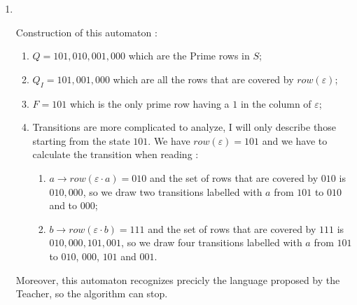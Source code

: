 \begin{enumerate}
  \item \begin{minipage}{0.3\textwidth}
          
        \end{minipage}\quad\\
        \begin{minipage}{1\textwidth}
          Construction of this automaton :
          \begin{enumerate}
            \item $Q = {101,010,001,000}$ which are the Prime rows in $S$;
            \item $Q_I = {101,001,000}$ which are all the rows that are covered by $row(\varepsilon)$;
            \item $F = {101}$ which is the only prime row having a $1$ in the column of $\varepsilon$;
            \item Transitions are more complicated to analyze, I will only describe those starting from the state $101$. We have $row(\varepsilon) = 101$ and we have to calculate the transition when reading :
                  \begin{enumerate}
                    \item $a \rightarrow row(\varepsilon \cdot a) = 010$ and the set of rows that are covered by $010$ is ${010, 000}$, so we draw two transitions labelled with $a$ from $101$ to $010$ and to $000$;
                    \item $b \rightarrow row(\varepsilon \cdot b) = 111$ and the set of rows that are covered by $111$ is ${010, 000, 101, 001}$, so we draw four transitions labelled with $a$ from $101$ to $010$, $000$, $101$ and $001$.
                  \end{enumerate}
          \end{enumerate}
          Moreover, this automaton recognizes precicly the language proposed by the Teacher, so the algorithm can stop.
        \end{minipage}
\end{enumerate}